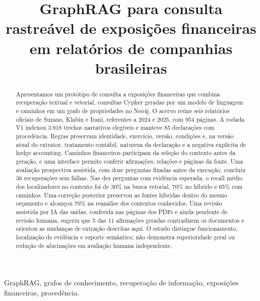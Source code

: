 \documentclass[conference]{IEEEtran}
\begin{document}
\title{GraphRAG para consulta rastreável de exposições financeiras em relatórios de companhias brasileiras}

\author{
}

\maketitle

\begin{abstract}
Apresentamos um protótipo de consulta a exposições financeiras que combina recuperação textual e vetorial, consultas Cypher geradas por um modelo de linguagem e caminhos em um grafo de propriedades no Neo4j. O acervo reúne seis relatórios oficiais de Suzano, Klabin e Irani, referentes a 2024 e 2025, com 954 páginas. A rodada V1 indexou 3.918 trechos narrativos elegíveis e manteve 85 declarações com procedência. Regras preservam identidade, exercício, versão, condições e, na versão atual do extrator, tratamento contábil, natureza da declaração e a negativa explícita de hedge accounting. Caminhos financeiros participam da seleção do contexto antes da geração, e uma interface permite conferir afirmações, relações e páginas da fonte. Uma avaliação prospectiva assistida, com doze perguntas fixadas antes da execução, concluiu 36 recuperações sem falhas. Nas dez perguntas com evidência esperada, o recall médio dos localizadores no contexto foi de 30\% na busca vetorial, 70\% no híbrido e 65\% com caminhos. Uma correção posterior preservou as fontes híbridas dentro do mesmo orçamento e alcançou 70\% na reanálise dos contextos conhecidos. Uma revisão assistida por IA das saídas, conferida nas páginas dos PDFs e ainda pendente de revisão humana, sugeriu que 5 das 11 afirmações geradas contradizem os documentos e orientou as mudanças de extração descritas aqui. O estudo distingue funcionamento, localização de evidência e suporte semântico; não demonstra superioridade geral ou redução de alucinações em avaliação humana independente.
\end{abstract}

\begin{IEEEkeywords}
GraphRAG, grafos de conhecimento, recuperação de informação, exposições financeiras, procedência.
\end{IEEEkeywords}
\end{document}
